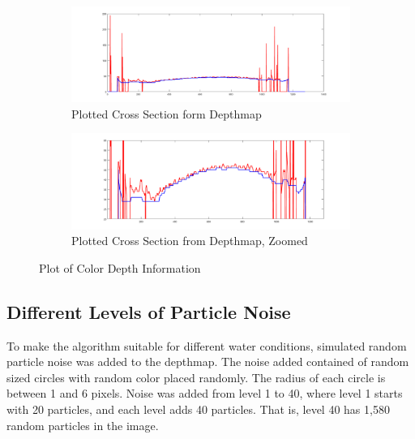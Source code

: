 \begin{figure}[H]
    \centering
    \begin{subfigure}{1\textwidth}
        \centering
        \includegraphics[width=1\linewidth]{images/results/plot_row}
        \caption{Plotted Cross Section form Depthmap} 
        \label{fig:plot1}
    \end{subfigure}\hspace*{\fill}
    
    \medskip
    \begin{subfigure}{1\textwidth}
        \centering
        \includegraphics[width=1\linewidth]{images/results/plot_zoomed}
        \caption{Plotted Cross Section from Depthmap, Zoomed} 
        \label{fig:plot2}
    \end{subfigure}\hspace*{\fill}
    \caption{Plot of Color Depth Information}
    \label{fig:row_plot}
\end{figure}




\subsection{Different Levels of Particle Noise} \label{section:noise}

To make the algorithm suitable for different water conditions, simulated random particle noise was added to the depthmap. The noise added contained of random sized circles with random color placed randomly. The radius of each circle is between 1 and 6 pixels.
Noise was added from level 1 to 40, where level 1 starts with 20 particles, and each level adds 40 particles. That is, level 40 has 1,580 random particles in the image.


